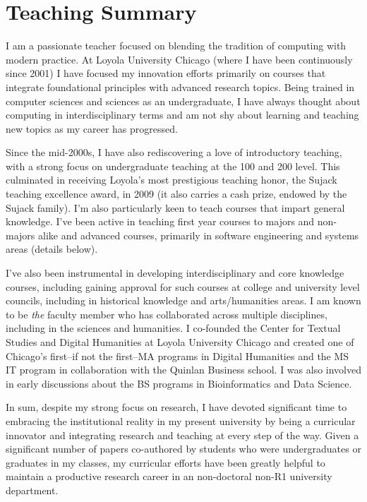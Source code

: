 \newpage
\section{Teaching Summary}

I am a passionate teacher focused on blending the tradition of computing with modern practice. At Loyola University Chicago (where I have been continuously since 2001) I have focused my innovation efforts primarily on courses that integrate foundational principles with advanced research topics. Being trained in computer sciences and sciences as an undergraduate, I have always thought about computing in interdisciplinary terms and am not shy about learning and teaching new topics as my career has progressed.
\vspace{5pt}

Since the mid-2000s, I have also rediscovering a love of introductory teaching, with a strong focus on undergraduate teaching at the 100 and 200 level. This culminated in receiving Loyola's most prestigious teaching honor, the Sujack teaching excellence award, in 2009 (it also carries a cash prize, endowed by the Sujack family). I'm also particularly keen to teach courses that impart general knowledge. I've been active in teaching first year courses to majors and non-majors alike and advanced courses, primarily in software engineering and systems areas (details below). 
\vspace{5pt}

I've also been instrumental in developing interdisciplinary and core knowledge courses, including gaining approval for such courses at college and university level councils, including in historical knowledge and arts/humanities areas. I am known to be \emph{the} faculty member who has collaborated across multiple disciplines, including in the sciences and humanities. I co-founded the Center for Textual Studies and Digital Humanities at Loyola University Chicago and created one of Chicago's first--if not the first--MA programs in Digital Humanities and the MS IT program in collaboration with the Quinlan Business school. I was also involved in early discussions about the BS programs in Bioinformatics and Data Science.
\vspace{5pt}

In sum, despite my strong focus on research, I have devoted significant time to embracing the institutional reality in my present university by being a curricular innovator and integrating research and teaching at every step of the way. Given a significant number of papers co-authored by students who were undergraduates or graduates in my classes, my curricular efforts have been greatly helpful to maintain a productive research career in an non-doctoral non-R1 university department.
\vspace{5pt}

